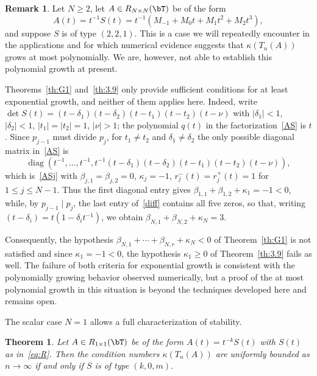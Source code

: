 \documentclass[addpoints,12pt,letter]{article}
\DeclareMathOperator{\diag}{diag}
\newcommand{\be}{\beta}
\newcommand{\de}{\delta}
\newcommand{\ka}{\kappa}
\newcommand{\nf}{\infty}
\newcommand{\SR}{S}
\renewcommand{\ge}{\geqslant}
\renewcommand{\le}{\leqslant}
\numberwithin{equation}{section}
\newtheorem{theorem}[lemma]{Theorem}
\theoremstyle{definition}
\newtheorem{remark}[lemma]{Remark}
\begin{document}
\begin{remark} \label{rm:221}
Let $N\ge 2$, let $A\in R_{N \times N}(\bT)$ be of the form
\[
A(t)=t^{-1}\SR(t)=t^{-1}(M_{-1}+M_{0}t+M_{1}t^{2}+M_{2}t^{3}),
\]
and suppose $\SR$ is of type $(2,2,1)$.
This is a case we will repeatedly encounter in the applications and for which numerical evidence suggests that $\ka(T_{n}(A))$ grows at most polynomially. We are, however, not able to establish this polynomial growth at present.

Theorems~\ref{th:G1} and~\ref{th:3.9} only provide sufficient conditions for at least exponential growth, and neither of them applies here.
Indeed, write $\det \SR(t)=(t-\de_{1})(t-\de_{2})(t-t_{1})(t-t_{2})(t-\nu)$ with $|\de_{1}|<1$, $|\de_{2}|<1$, $|t_{1}|=|t_{2}|=1$, $|\nu|>1$; the polynomial $q(t)$ in the factorization~\eqref{AS} is $t$.
Since $p_{j-1}$ must divide $p_{j}$, for $t_{1}\neq t_{2}$ and $\de_{1}\neq\de_{2}$ the only possible diagonal matrix in~\eqref{AS} is
\begin{equation}\label{diff}
\diag(t^{-1}, \ldots, t^{-1}, t^{-1} (t-\de_{1})(t-\de_{2})(t-t_{1})(t-t_{2})(t-\nu)),
\end{equation}
which is~\eqref{ASj} with $\be_{j,1}=\be_{j,2}=0$, $\ka_{j}=-1$, $r_{j}^{-}(t)=r_{j}^{+}(t)=1$ for $1\le j\le N-1$.
Thus the first diagonal entry gives $\be_{1,1}+\be_{1,2}+\ka_{1}=-1<0$, while, by $p_{j-1}\mid p_{j}$, the last entry of~\eqref{diff} contains all five zeros, so that, writing $(t-\de_{i})=t(1-\de_{i}t^{-1})$, we obtain $\be_{N,1}+\be_{N,2}+\ka_{N}=3$.

Consequently, the hypothesis $\be_{N,1}+\cdots+\be_{N,r}+\ka_{N}<0$ of Theorem~\ref{th:G1} is not satisfied and since $\ka_{1}=-1<0$, the hypothesis $\ka_{1}\ge 0$ of Theorem~\ref{th:3.9} fails as well. The failure of both criteria for exponential growth is consistent with the polynomially growing behavior observed numerically, but a proof of the at most polynomial growth in this situation is beyond the techniques developed here and remains open.
\end{remark}

The scalar case $N=1$ allows a full characterization of stability.

\begin{theorem}
Let $A\in R_{1\times 1}(\bT)$ be of the form $A(t)=t^{-k}\SR(t)$ with $\SR(t)$ as in~\eqref{eq:R}.
Then the condition numbers $\ka(T_{n}(A))$ are uniformly bounded as $n\to\nf$ if and only if $\SR$ is of type $(k,0,m)$.
\end{theorem}
\end{document}
